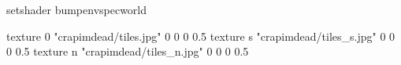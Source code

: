 setshader bumpenvspecworld

texture 0 "crapimdead/tiles.jpg" 0 0 0 0.5
texture s "crapimdead/tiles_s.jpg" 0 0 0 0.5
texture n "crapimdead/tiles_n.jpg" 0 0 0 0.5

